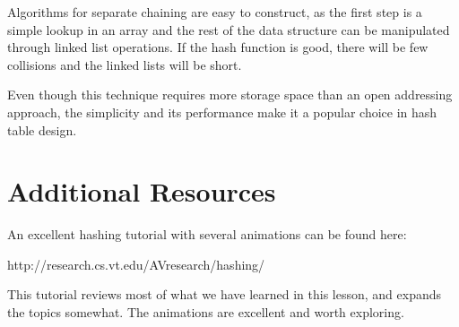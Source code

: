      Algorithms for separate chaining are easy to construct, as the first step is a simple lookup in an array and the rest of the data structure can be manipulated through linked list operations. If the hash function is good, there will be few collisions and the linked lists will be short.
   
Even though this technique requires more storage space than an open addressing approach, the simplicity and its performance make it a popular choice in hash table design.


\section{Additional Resources}
An excellent hashing tutorial with several animations can be found here:      

       http://research.cs.vt.edu/AVresearch/hashing/

       This tutorial reviews most of what we have learned in this lesson, and        expands the topics somewhat. The animations are excellent and worth exploring.   
       
